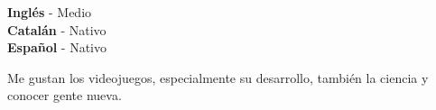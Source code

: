 \documentclass[9pt]{developercv} %
\begin{document}
\begin{minipage}[t]{0.3\textwidth}
	\vspace{-\baselineskip} %

	
	\textbf{Inglés} - Medio\\
	\textbf{Catalán} - Nativo\\
	\textbf{Español} - Nativo\\
\end{minipage}
\hfill
\begin{minipage}[t]{0.3\textwidth}
	\vspace{-\baselineskip} %
	
	
	Me gustan los videojuegos, especialmente su desarrollo, también la ciencia y conocer gente nueva.
	
\end{minipage}
\hfill

\end{document}

